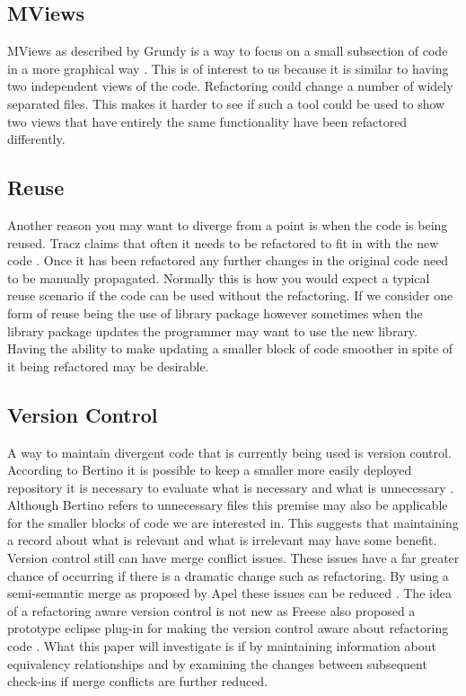 \documentclass[12pt]{CRPITStyle}
\renewcommand{\cite}{\citep}
\begin{document}
\subsection{MViews}
MViews as described by Grundy is a way to focus on a small subsection of code in a more graphical way \cite{Grundy1993}. This is of interest to us because it is similar to having two independent views of the code. Refactoring could change a number of widely separated files. This makes it harder to see if such a tool could be used to show two views that have entirely the same functionality have been refactored differently. 
\subsection{Reuse}
Another reason you may want to diverge from a point is when the code is being reused. Tracz claims that often it needs to be refactored to fit in with the new code \cite{Tracz1995}. Once it has been refactored any further changes in the original code need to be manually propagated. Normally this is how you would expect a typical reuse scenario if the code can be used without the refactoring. If we consider one form of reuse being the use of library package however sometimes when the library package updates the programmer may want to use the new library. Having the ability to make updating a smaller block of code smoother in spite of it being refactored may be desirable. 
\subsection{Version Control} 
A way to maintain divergent code that is currently being used is version control. According to Bertino it is possible to keep a smaller more easily deployed repository it is necessary to evaluate what is necessary and what is unnecessary \cite{Bertino2012}. Although Bertino refers to unnecessary files this premise may also be applicable for the smaller blocks of code we are interested in. This suggests that maintaining a record about what is relevant and what is irrelevant may have some benefit. Version control still can have merge conflict issues. These issues have a far greater chance of occurring if there is a dramatic change such as refactoring. By using a semi-semantic merge as proposed by Apel these issues can be reduced \cite{Apel2011}. The idea of a refactoring aware version control is not new as Freese also proposed a prototype eclipse plug-in for making the version control aware about refactoring code \cite{Freese2006}. What this paper will investigate is if by maintaining information about equivalency relationships and by examining the changes between subsequent check-ins if merge conflicts are further reduced. 
\end{document}
